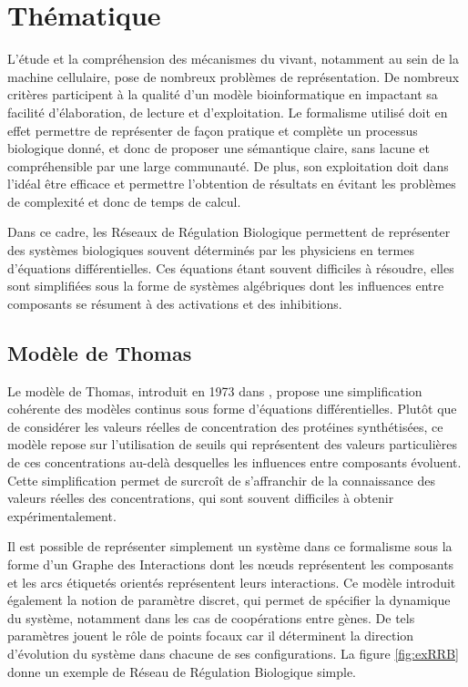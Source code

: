 \chapter{Thématique}

L'étude et la compréhension des mécanismes du vivant, notamment au sein de la machine cellulaire, pose de nombreux problèmes de représentation.
De nombreux critères participent à la qualité d'un modèle bioinformatique en impactant sa facilité d'élaboration, de lecture et d'exploitation.
Le formalisme utilisé doit en effet permettre de représenter de façon pratique et complète un processus biologique donné, et donc
de proposer une sémantique claire, sans lacune et compréhensible par une large communauté.
De plus, son exploitation doit dans l'idéal être efficace et permettre l'obtention de résultats en évitant les problèmes de complexité et donc de temps de calcul.

Dans ce cadre, les Réseaux de Régulation Biologique permettent de représenter des systèmes biologiques souvent déterminés par les physiciens en termes d'équations différentielles.
Ces équations étant souvent difficiles à résoudre, elles sont simplifiées sous la forme de systèmes algébriques dont les influences entre composants se résument à des activations et des inhibitions.

\section{Modèle de Thomas}
Le modèle de Thomas, introduit en 1973 dans \cite{Thomas73}, propose une simplification cohérente des modèles continus sous forme d'équations différentielles.
Plutôt que de considérer les valeurs réelles de concentration des protéines synthétisées, ce modèle repose sur l'utilisation de seuils qui représentent des valeurs particulières de ces concentrations au-delà desquelles les influences entre composants évoluent.
Cette simplification permet de surcroît de s'affranchir de la connaissance des valeurs réelles des concentrations, qui sont souvent difficiles à obtenir expérimentalement.

Il est possible de représenter simplement un système dans ce formalisme sous la forme d'un Graphe des Interactions dont les nœuds représentent les composants et les arcs étiquetés orientés représentent leurs interactions.
Ce modèle introduit également la notion de paramètre discret, qui permet de spécifier la dynamique du système, notamment dans les cas de coopérations entre gènes.
De tels paramètres jouent le rôle de points focaux car il déterminent la direction d'évolution du système dans chacune de ses configurations.
La figure \ref{fig:exRRB} donne un exemple de Réseau de Régulation Biologique simple.


